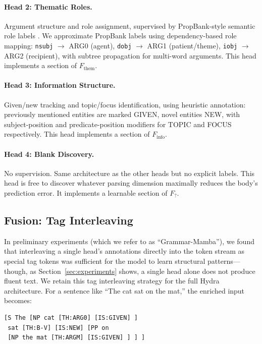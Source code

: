 \documentclass[11pt]{article}
\begin{document}
\paragraph{Head 2: Thematic Roles.}
Argument structure and role assignment, supervised by PropBank-style 
semantic role labels \cite{palmer2005proposition}. We approximate PropBank 
labels using dependency-based role mapping: \texttt{nsubj} $\to$ ARG0 
(agent), \texttt{dobj} $\to$ ARG1 (patient/theme), \texttt{iobj} $\to$ 
ARG2 (recipient), with subtree propagation for multi-word arguments. 
This head implements a section of $F_{\text{them}}$.

\paragraph{Head 3: Information Structure.}
Given/new tracking and topic/focus identification, using heuristic 
annotation: previously mentioned entities are marked GIVEN, novel entities 
NEW, with subject-position and predicate-position modifiers for TOPIC 
and FOCUS respectively. This head implements a section of $F_{\text{info}}$.

\paragraph{Head 4: Blank Discovery.}
No supervision. Same architecture as the other heads but no explicit 
labels. This head is free to discover whatever parsing dimension 
maximally reduces the body's prediction error. It implements a learnable 
section of $F_{\text{?}}$.

\subsection{Fusion: Tag Interleaving}

In preliminary experiments (which we refer to as ``Grammar-Mamba''), we 
found that interleaving a single head's annotations directly into the 
token stream as special tag tokens was sufficient for the model to learn 
structural patterns---though, as Section~\ref{sec:experiments} shows, a 
single head alone does not produce fluent text. We retain this tag 
interleaving strategy for the full Hydra architecture. For a sentence like ``The cat sat on the mat,'' the enriched 
input becomes:

\begin{small}
\begin{verbatim}
[S The [NP cat [TH:ARG0] [IS:GIVEN] ]
 sat [TH:B-V] [IS:NEW] [PP on
 [NP the mat [TH:ARGM] [IS:GIVEN] ] ] ]
\end{verbatim}
\end{small}
\end{document}
